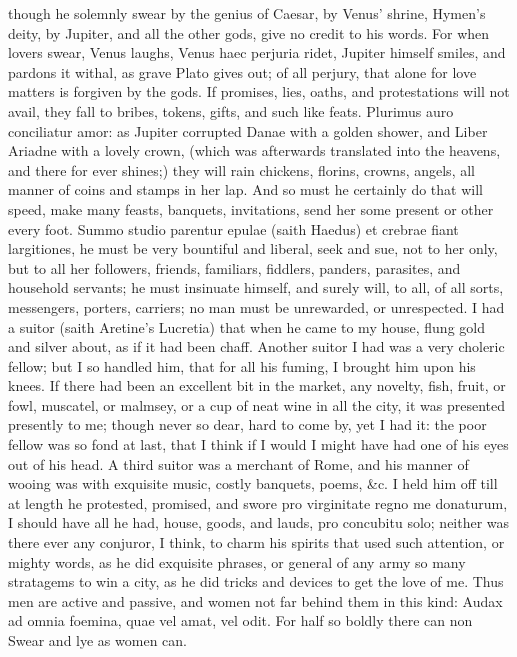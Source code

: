 {though he solemnly swear by the genius of Caesar, by Venus' shrine,
Hymen's deity, by Jupiter, and all the other gods, give no credit to
his words. For when lovers swear, Venus laughs, Venus haec perjuria
ridet, Jupiter himself smiles, and pardons it withal, as grave
Plato gives out; of all perjury, that alone for love matters is
forgiven by the gods. If promises, lies, oaths, and protestations will
not avail, they fall to bribes, tokens, gifts, and such like feats.
Plurimus auro conciliatur amor: as Jupiter corrupted Danae with a
golden shower, and Liber Ariadne with a lovely crown, (which was
afterwards translated into the heavens, and there for ever shines;)
they will rain chickens, florins, crowns, angels, all manner of coins
and stamps in her lap. And so must he certainly do that will speed,
make many feasts, banquets, invitations, send her some present or other
every foot. Summo studio parentur epulae (saith Haedus) et
crebrae fiant largitiones, he must be very bountiful and liberal, seek
and sue, not to her only, but to all her followers, friends, familiars,
fiddlers, panders, parasites, and household servants; he must insinuate
himself, and surely will, to all, of all sorts, messengers, porters,
carriers; no man must be unrewarded, or unrespected. I had a suitor
(saith Aretine's Lucretia) that when he came to my house, flung
gold and silver about, as if it had been chaff. Another suitor I had
was a very choleric fellow; but I so handled him, that for all his
fuming, I brought him upon his knees. If there had been an excellent
bit in the market, any novelty, fish, fruit, or fowl, muscatel, or
malmsey, or a cup of neat wine in all the city, it was presented
presently to me; though never so dear, hard to come by, yet I had it:
the poor fellow was so fond at last, that I think if I would I might
have had one of his eyes out of his head. A third suitor was a merchant
of Rome, and his manner of wooing was with exquisite music,
costly banquets, poems, \&c. I held him off till at length he protested,
promised, and swore pro virginitate regno me donaturum, I should have
all he had, house, goods, and lauds, pro concubitu solo; neither
was there ever any conjuror, I think, to charm his spirits that used
such attention, or mighty words, as he did exquisite phrases, or
general of any army so many stratagems to win a city, as he did tricks
and devices to get the love of me. Thus men are active and passive, and
women not far behind them in this kind: Audax ad omnia foemina, quae
vel amat, vel odit.
For half so boldly there can non
Swear and lye as women can.

}
